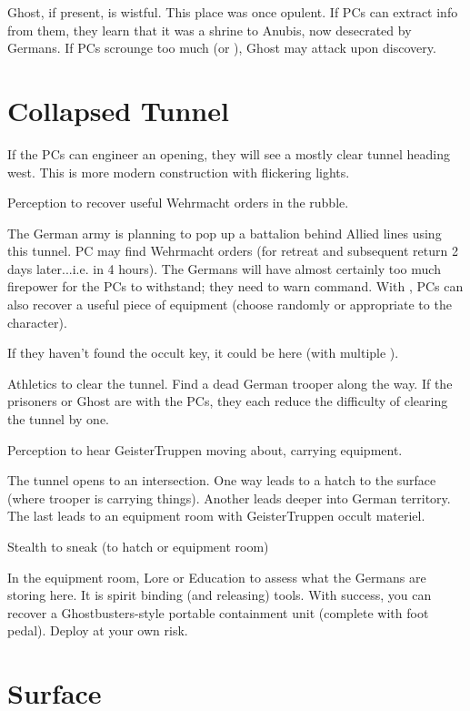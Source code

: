 \documentclass{book}
\newcommand{\df}{\DifficultyDie }
\newcommand{\stb}{\SetbackDie }
\begin{document}
\begin{multicols}{2}
Ghost, if present, is wistful.  This place was once opulent.  If PCs can extract info from them, they learn that it was a shrine to Anubis, now desecrated by Germans.  If PCs scrounge too much (\Threat\Threat\Threat or \Despair), Ghost may attack upon discovery.


\section{Collapsed Tunnel}

If the PCs can engineer an opening, they will see a mostly clear tunnel heading west.  This is more modern construction with flickering lights.

\df\df Perception to recover useful Wehrmacht orders in the rubble.

The German army is planning to pop up a battalion behind Allied lines using this tunnel.  PC may find Wehrmacht orders (for retreat and subsequent return 2 days later...i.e. in 4 hours).  The Germans will have almost certainly too much firepower for the PCs to withstand; they need to warn command.  With \Advantage\Advantage, PCs can also recover a useful piece of equipment (choose randomly or appropriate to the character).

If they haven't found the occult key, it could be here (with multiple \Advantage).

\df\df\df Athletics to clear the tunnel.  Find a dead German trooper along the way.  
If the prisoners or Ghost are with the PCs, they each reduce the difficulty of clearing the tunnel by one.

\df\df Perception to hear GeisterTruppen moving about, carrying equipment.

The tunnel opens to an intersection.  One way leads to a hatch to the surface (where trooper is carrying things).  Another leads deeper into German territory.  The last leads to an equipment room with GeisterTruppen occult materiel.

\df\df Stealth to sneak (to hatch or equipment room)

In the equipment room, \df\df Lore or \df\df\stb Education to assess what the Germans are storing here.  It is spirit binding (and releasing) tools.  With success, you can recover a Ghostbusters-style portable containment unit (complete with foot pedal).  Deploy at your own risk.

\section{Surface}


\end{multicols}
\end{document}

